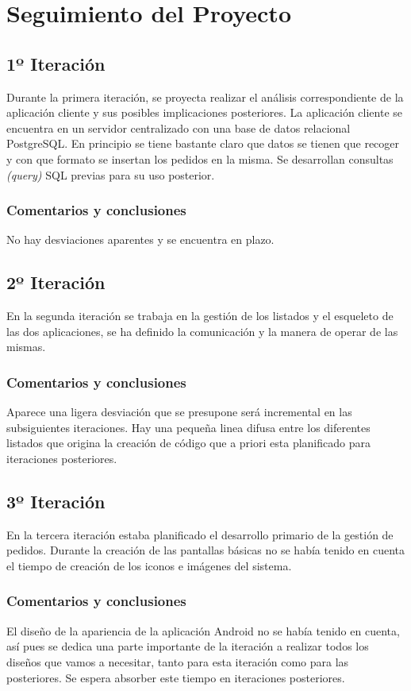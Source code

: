 \section{Seguimiento del Proyecto}

\subsection{1º Iteración}
Durante la primera iteración, se proyecta realizar el análisis correspondiente de la aplicación cliente y sus posibles implicaciones posteriores. La aplicación cliente se encuentra en un servidor centralizado con una base de datos relacional PostgreSQL.
En principio se tiene bastante claro que datos se tienen que recoger y con que formato se insertan los pedidos en la misma. Se desarrollan consultas \textit{(query)} SQL\textsl{} previas para su uso posterior.
\subsubsection{Comentarios y conclusiones }
No hay desviaciones aparentes y se encuentra en plazo.

\subsection{2º Iteración}
En la segunda iteración se trabaja en la gestión de los listados y el esqueleto de las dos aplicaciones, se ha definido la comunicación y la manera de operar de las mismas. 
\subsubsection{Comentarios y conclusiones }
Aparece una ligera desviación que se presupone será incremental en las subsiguientes iteraciones. Hay una pequeña linea difusa entre los diferentes listados que origina la 
creación de código que a priori esta planificado para iteraciones posteriores.
\subsection{3º Iteración}
En la tercera iteración estaba planificado el desarrollo primario de la gestión de pedidos. Durante la creación de las pantallas básicas no se había tenido en cuenta el tiempo de creación de los iconos e imágenes del sistema.
\subsubsection{Comentarios y conclusiones }
El diseño de la apariencia de la aplicación  Android no se había tenido en cuenta, así pues se dedica una parte importante de la iteración a realizar todos los diseños que vamos a necesitar, tanto para esta iteración como para las posteriores. Se espera absorber este tiempo en iteraciones posteriores.
